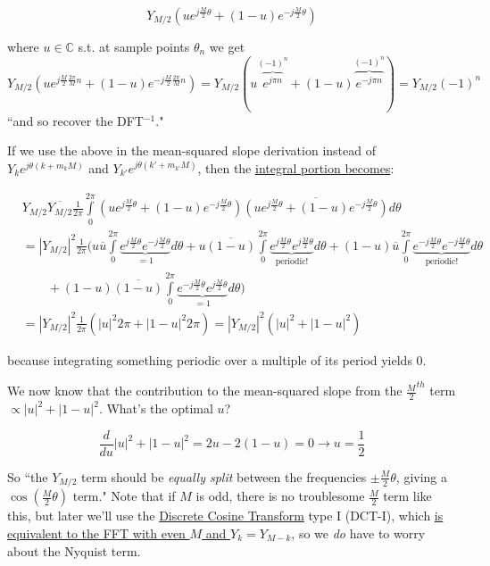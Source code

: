 \documentclass[10pt]{article}
\begin{document}
$$Y_{M/2}(ue^{j\frac{M}{2}\theta} + (1 - u)e^{-j\frac{M}{2}\theta})$$\vspace{-7mm}

where $u \in \mathbb{C}$ s.t. at sample points $\theta_n$ we get $Y_{M/2}(ue^{j\frac{M}{2}\frac{2\pi}{M}n} + (1-u)e^{-j\frac{M}{2}\frac{2\pi}{M}n}) = Y_{M/2}(u\overbrace{e^{j\pi n}}^{(-1)^n} + (1-u)\overbrace{e^{-j\pi n}}^{(-1)^n}) = Y_{M/2}(-1)^n$ ``and so recover the DFT$^{-1}$."

If we use the above in the mean-squared slope derivation instead of $Y_k e^{j \theta (k + m_k M)}$ and $Y_{k'} e^{j \theta (k' + m_{k'} M)}$, then the \href{https://math.stackexchange.com/a/5013632/278341}{integral portion becomes}:\vspace{-5mm}

\begin{align*}
& Y_{M/2}\overline{Y_{M/2}}\frac{1}{2\pi} \int\limits_{0}^{2\pi} (ue^{j\frac{M}{2}\theta} + (1 - u)e^{-j\frac{M}{2}\theta}) \overline{(ue^{j\frac{M}{2}\theta} + (1 - u)e^{-j\frac{M}{2}\theta})} d\theta \\
&= |Y_{M/2}|^2 \frac{1}{2\pi} \Big(u\overline{u} \int\limits_{0}^{2\pi} \underbrace{e^{j\frac{M}{2}\theta} e^{-j\frac{M}{2}\theta}}_{= 1} d\theta + u \overline{(1 - u)} \int\limits_{0}^{2\pi} \underbrace{e^{j\frac{M}{2}\theta} e^{j\frac{M}{2}\theta}}_{\text{periodic!}} d\theta + (1 - u)\overline{u} \int\limits_{0}^{2\pi} \underbrace{e^{-j\frac{M}{2}\theta} e^{-j\frac{M}{2}\theta}}_{\text{periodic!}} d\theta \\
& \quad \quad + (1 - u) \overline{(1 - u)} \int\limits_{0}^{2\pi} \underbrace{e^{-j\frac{M}{2}\theta} e^{j\frac{M}{2}\theta}}_{= 1} d\theta \Big) \\
&= |Y_{M/2}|^2 \frac{1}{2\pi} (|u|^2 2\pi + |1 - u|^2 2\pi) = |Y_{M/2}|^2 (|u|^2 + |1 - u|^2)
\end{align*}

because integrating something periodic over a multiple of its period yields 0.\newline

We now know that the contribution to the mean-squared slope from the $\frac{M}{2}^{th}$ term $\propto |u|^2 + |1 - u|^2$. What's the optimal $u$?\vspace{-2mm}

$$\frac{d}{du} |u|^2 + |1 - u|^2 = 2u - 2(1-u) = 0 \longrightarrow u = \frac{1}{2}$$

So ``the $Y_{M/2}$ term should be \textit{equally split} between the frequencies $\pm\frac{M}{2}\theta$, giving a $\cos(\frac{M}{2}\theta)$ term." Note that if $M$ is odd, there is no troublesome $\frac{M}{2}$ term like this, but later we'll use the \href{https://docs.scipy.org/doc/scipy/reference/generated/scipy.fft.dct.html}{Discrete Cosine Transform}\cite{dct} type I (DCT-I), which \hyperref[fftdct]{is equivalent to the FFT with even $M$ and $Y_k = Y_{M-k}$}, so we \textit{do} have to worry about the Nyquist term.
\end{document}

